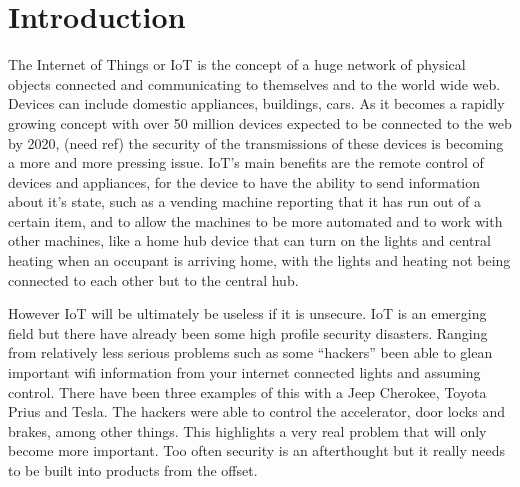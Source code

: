 
\chapter{Introduction}
\label{intro}


\newcommand{\keyword}[1]{\textbf{#1}}
\newcommand{\tabhead}[1]{\textbf{#1}}
\newcommand{\code}[1]{\texttt{#1}}
\newcommand{\file}[1]{\texttt{\bfseries#1}}
\newcommand{\option}[1]{\texttt{\itshape#1}}


The Internet of Things or IoT is the concept of a huge network of physical objects connected and communicating to themselves and to the world wide web.
Devices can include domestic appliances, buildings, cars. As it becomes a rapidly growing concept with over 50 million devices expected to be connected to the web by 2020, (need ref)
the security of the transmissions of these devices is becoming a more and more pressing issue. IoT's main benefits are the remote control of devices and appliances, 
for the device to have the ability to send information about it's state, such as a vending machine reporting that it has run out of a certain item, and to allow the machines to be 
more automated and to work with other machines, like a home hub device that can turn on the lights and central heating when an occupant is arriving home, with the lights and heating not being connected to each other but to the 
central hub.
	
	However IoT will be ultimately be useless if it is unsecure. IoT is an emerging field but there have already been some high profile security disasters. Ranging from relatively less serious problems such as
some ``hackers''  been able to glean important wifi information from your internet connected lights %
and assuming control. There have been three examples of this with a Jeep Cherokee, Toyota Prius and Tesla. The hackers were able to control the accelerator, door locks and brakes, among other things. This highlights
a very real problem that will only become more important. Too often security is an afterthought but it really needs to be built into products from the offset.
	
